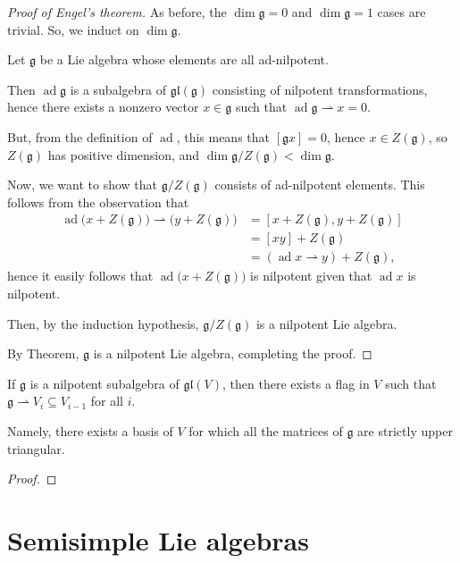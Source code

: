 \documentclass{article}
\newcommand{\lb}[1]{\ensuremath{\left[{#1}\right]}}
\DeclareMathOperator{\ad}{ad}
\newcommand*\frkg{{\ensuremath{\mathfrak{g}}}}
\newcommand*\glalg{\ensuremath{\mathfrak{gl}}}
\newcommand*\acts{\ensuremath{\rightharpoonup}}
\begin{document}
\begin{proof}[Proof of Engel's theorem]
    As before, the $\dim \frkg = 0$ and $\dim \frkg = 1$ cases are trivial.
    So, we induct on $\dim \frkg$.

    Let $\frkg$ be a Lie algebra whose elements are all ad-nilpotent.

    Then $\ad \frkg$ is a subalgebra of $\glalg(\frkg)$ consisting of nilpotent transformations, hence there exists a nonzero vector $x \in \frkg$ such that $\ad \frkg \rightharpoonup x = 0$.

    But, from the definition of $\ad$, this means that $\lb{\frkg x} = 0$, hence $x \in Z(\frkg)$, so $Z(\frkg)$ has positive dimension, and $\dim \frkg / Z(\frkg) < \dim \frkg$.

    Now, we want to show that $\frkg/Z(\frkg)$ consists of ad-nilpotent elements.
    This follows from the observation that
    \begin{align*}
        \ad \Big(x + Z(\frkg)\Big) \rightharpoonup \Big(y + Z(\frkg)\Big)
        &= 
        \lb{x + Z(\frkg), y + Z(\frkg)} 
        \\
        &= \lb{xy} + Z(\frkg) 
        \\
        &= (\ad x \rightharpoonup y) + Z(\frkg),
    \end{align*}
    hence it easily follows that $\ad \Big(x + Z(\frkg)\Big)$ is nilpotent given that $\ad x$ is nilpotent.
    
    Then, by the induction hypothesis, $\frkg/Z(\frkg)$ is a nilpotent Lie algebra.

    By Theorem, $\frkg$ is a nilpotent Lie algebra, completing the proof.
\end{proof}

\begin{corollary}
    If $\frkg$ is a nilpotent subalgebra of $\glalg(V)$, then there exists a flag in $V$ such that $\frkg \acts V_i \subseteq V_{i-1}$ for all $i$.

    Namely, there exists a basis of $V$ for which all the matrices of $\frkg$ are strictly upper triangular.
\end{corollary}

\begin{proof}
\end{proof}

\section{Semisimple Lie algebras}
\end{document}
